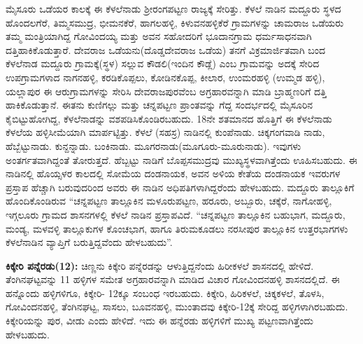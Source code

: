 ಮೈಸೂರು ಒಡೆಯರ ಕಾಲಕ್ಕೆ ಈ ಕೆಳಲೆನಾಡು ಶ‍್ರೀರಂಗಪಟ್ಟಣ ರಾಜ್ಯಕ್ಕೆ ಸೇರಿತ್ತು. ಕೆಳಲೆ ನಾಡಿನ ಮದ್ದೂರು ಸ್ಥಳದ ಹೊಂದಲಗೆರೆ, ತಿಮ್ಮಸಮುದ್ರ, ಭೀಮನಕೆರೆ, ಹಾಗಲಹಳ್ಳಿ, ಕಿಳುವನಹಳ್ಳಿಕೆರೆ ಗ್ರಾಮಗಳನ್ನು ಚಾಮರಾಜ ಒಡೆಯರು ತಮ್ಮ ಮಂತ್ರಿಯಾಗಿದ್ದ ಗೋವಿಂದಯ್ಯ ಮತ್ತು ಅವನ ಸಹೋದರಿಗೆ ಭೂದಾನಗ್ರಾಮ ಧರ್ಮಸಾಧನವಾಗಿ ದತ್ತಿಹಾಕಿಕೊಡುತ್ತಾರೆ. ದೇವರಾಜ ಒಡೆಯನು(ದೊಡ್ಡದೇವರಾಜ ಒಡೆಯ) ತನಗೆ ವಿಕ್ರಮಾರ್ಜಿತವಾಗಿ ಬಂದ ಕೆಳಲೆನಾಡ ಮದ್ದೂರು ಗ್ರಾಮಕ್ಕೆ(ಸ್ಥಳ) ಸಲ್ಲುವ ಕೌಡಲಿ(ಇಂದಿನ ಕೌಡ್ಲೆ) ಎಂಬ ಗ್ರಾಮವನ್ನು ಅದಕ್ಕೆ ಸೇರಿದ ಉಪಗ್ರಾಮಗಳಾದ ನಾಗನಹಳ್ಳಿ, ಕರಡಿಕೊಪ್ಪಲು, ಕೋಡಿನಕೊಪ್ಪ, ಕೀಲಾರ, ಉಂಮರಹಳ್ಳಿ (ಉಮ್ಮಡ ಹಳ್ಳಿ), ಯಲ್ಲಾಪುರ ಈ ಆರುಗ್ರಾಮಗಳನ್ನು ಸೇರಿಸಿ ದೇವರಾಜಪುರವೆಂಬ ಅಗ್ರಹಾರವನ್ನಾಗಿ ಮಾಡಿ ಬ್ರಾಹ್ಮಣರಿಗೆ ದತ್ತಿ ಹಾಕಿಕೊಡುತ್ತಾನೆ. ಈತನು ಕುಣಿಗಲ್ಲು ಮತ್ತು ಚನ್ನಪಟ್ಟಣ ಪ್ರಾಂತವನ್ನು ಗೆದ್ದ ಸಂದರ್ಭದಲ್ಲಿ ಮೈಸೂರಿನ ಕೈಬಿಟ್ಟುಹೋಗಿದ್ದ, ಕೆಳಲೆನಾಡನ್ನು ವಶಪಡಿಸಿಕೊಂಡಿರಬಹುದು. 18ನೇ ಶತಮಾನದ ಹೊತ್ತಿಗೆ ಈ ಕೆಳಲೆನಾಡು ಕೆಳಲೆಯ ಹಳ್ಳಿಸೀಮೆಯಾಗಿ ಮಾರ್ಪಟ್ಟಿತ್ತು. ಕೆಳಲೆ (ಸಹಸ್ರ) ನಾಡಿನಲ್ಲಿ ಕುಂಪೆನಾಡು. ಚಿಕ್ಕಗಂಗವಾಡಿ ನಾಡು, ಹೆಬ್ಬೆಟ್ಟುನಾಡು. ಕುನ್ದನ್ನಾಡು. ಬಂಕಿನಾಡು. ಮೂಗರನಾಡು(ಮೂಗೂರು-ಮೂರುನಾಡು). ಇವುಗಳು ಅಂತರ್ಗತ\-ವಾಗಿದ್ದಂತೆ ತೋರುತ್ತದೆ. ಹೆಬ್ಬಟ್ಟು ನಾಡಿಗೆ ಬೊಪ್ಪಸಮುದ್ರವು ಮುಖ್ಯಸ್ಥಳವಾಗಿತ್ತೆಂದು ಊಹಿಸಬಹುದು. ಈ ನಾಡಿನಲ್ಲಿ ಹೊಯ್ಸಳರ ಕಾಲದಲ್ಲಿ ಸೋಮೆಯ ದಂಡನಾಯಕ, ಅವನ ಅಳಿಯ ಕೇತೆಯ ದಂಡನಾಯಕ ಇವರುಗಳ ಪ್ರಸ್ತಾಪ ಹೆಚ್ಚಾಗಿ ಬರುವುದರಿಂದ ಅವರು ಈ ನಾಡಿನ ಅಧಿಪತಿಗಳಾಗಿದ್ದರೆಂದು ಹೇಳಬಹುದು. ಮದ್ದೂರು ತಾಲ್ಲೂಕಿಗೆ ಹೊಂದಿಕೊಂಡಿರುವ “ಚನ್ನಪಟ್ಟಣ ತಾಲ್ಲೂಕಿನ ಮಳೂರುಪಟ್ಟಣ, ಹರೂರು, ಅಬ್ಬೂರು, ಚಕ್ಕೆರೆ, ನಾಗೋಹಳ್ಳಿ, ಇಗ್ಗಲೂರು ಗ್ರಾಮದ ಶಾಸನಗಳಲ್ಲಿ ಕೆಳಲೆ ನಾಡಿನ ಪ್ರಸ್ತಾಪವಿದೆ. “ಚನ್ನಪಟ್ಟಣ ತಾಲ್ಲೂಕಿನ ಬಹುಭಾಗ, ಮದ್ದೂರು, ಮಂಡ್ಯ, ಮಳವಳ್ಳಿ ತಾಲ್ಲೂಕುಗಳ ಕೊಂಚಭಾಗ, ಹಾಗೂ ತಿರುಮಕೂಡಲು ನರಸೀಪುರ ತಾಲ್ಲೂಕಿನ ಉತ್ತರಭಾಗಗಳು ಕೆಳಲೆನಾಡಿನ ವ್ಯಾಪ್ತಿಗೆ ಬರುತ್ತಿದ್ದವೆಂದು ಹೇಳಬಹುದು”.

\textbf{ಕಿಕ್ಕೇರಿ ಪನ್ನೆರಡು(12):} ಚಿಣ್ಣನು ಕಿಕ್ಕೇರಿ ಪನ್ನೆರಡನ್ನು ಆಳುತ್ತಿದ್ದನೆಂದು ಹಿರೀಕಳಲೆ ಶಾಸನದಲ್ಲಿ ಹೇಳಿದೆ. ತೆಂಗಿನಘಟ್ಟವನ್ನು 11 ಹಳ್ಳಿಗಳ ಸಮೇತ ಅಗ್ರಹಾರವನ್ನಾಗಿ ಮಾಡಿದ ವಿಚಾರ ಗೋವಿಂದನಹಳ್ಳಿ ಶಾಸನದಲ್ಲಿದೆ. ಈ ಹನ್ನೊಂದು ಹಳ್ಳಿಗಳಿಗೂ, ಕಿಕ್ಕೇರಿ- 12ಕ್ಕೂ ಸಂಬಂಧ ಇರಬಹುದು. ಕಿಕ್ಕೇರಿ, ಹಿರಿಕಳಲೆ, ಚಿಕ್ಕಕಳಲೆ, ತೊಳಸಿ, ಗೋವಿಂದನಹಳ್ಳಿ, ತೆಂಗಿನಘಟ್ಟ, ಸಾಸಲು, ಬೂವನಹಳ್ಳಿ, ಮುಂತಾದವು ಕಿಕ್ಕೇರಿ-12ಕ್ಕೆ ಸೇರಿದ್ದ ಹಳ್ಳಿಗಳಾಗಿರಬಹುದು. ಕಿಕ್ಕೇರಿಯನ್ನು ಪುರ, ವೀಡು ಎಂದು ಹೇಳಿದೆ. ಇದು ಈ ಹನ್ನೆರಡು ಹಳ್ಳಿಗಳಿಗೆ ಮುಖ್ಯ ಪಟ್ಟಣವಾಗಿತ್ತೆಂದು ಹೇಳಬಹುದು.

